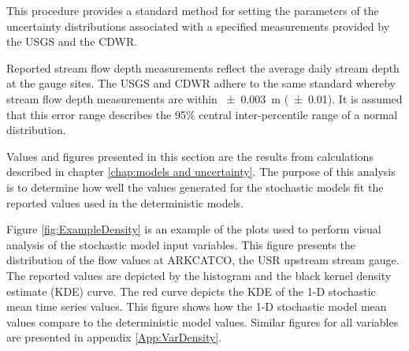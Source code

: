 \begin{linenumbers}
This procedure provides a standard method for setting the parameters of the uncertainty distributions associated with a specified measurements provided by the USGS and the CDWR.

Reported stream flow depth measurements reflect the average daily stream depth at the gauge sites.  The USGS and CDWR adhere to the same standard whereby stream flow depth measurements are within  \SI{\pm 0.003}{\meter} (\SI{\pm 0.01}{\foot}).  It is assumed that this error range describes the 95\% central inter-percentile range of a normal distribution.

Values and figures presented in this section are the results from calculations described in chapter \ref{chap:models and uncertainty}.  The purpose of this analysis is to determine how well the values generated for the stochastic models fit the reported values used in the deterministic models.

Figure \ref{fig:ExampleDensity} is an example of the plots used to perform visual analysis of the stochastic model input variables.  This figure presents the distribution of the flow values at ARKCATCO, the USR upstream stream gauge.  The reported values are depicted by the histogram and the black kernel density estimate (KDE) curve.  The red curve depicts the KDE of the 1-D stochastic mean time series values.  This figure shows how the 1-D stochastic model mean values compare to the deterministic model values.  Similar figures for all variables are presented in appendix \ref{App:VarDensity}.


\end{linenumbers}
